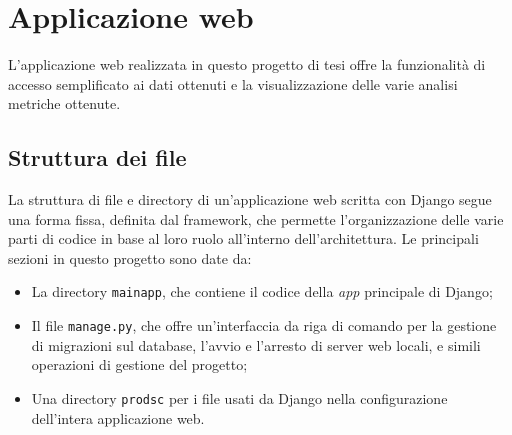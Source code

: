 
\section{Applicazione web}

L'applicazione web realizzata in questo progetto di tesi offre la funzionalità
di accesso semplificato ai dati ottenuti e la visualizzazione
delle varie analisi metriche ottenute.

\subsection{Struttura dei file}


La struttura di file e directory di un'applicazione web scritta con Django 
segue una forma fissa, definita dal framework, che permette l'organizzazione
delle varie parti di codice in base al loro ruolo all'interno dell'architettura.
Le principali sezioni in questo progetto sono date da:
\begin{itemize}
  \item La directory \texttt{mainapp}, che contiene il codice della \textit{app}
        principale di Django;
  \item Il file \texttt{manage.py}, che offre un'interfaccia da riga di comando
        per la gestione di migrazioni sul database, l'avvio e l'arresto di server
        web locali, e simili operazioni di gestione del progetto;
  \item Una directory \texttt{prodsc} per i file usati da Django nella configurazione
        dell'intera applicazione web.
\end{itemize}

